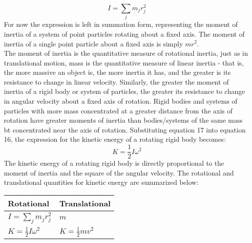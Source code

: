 \documentclass[a4paper]{article}
\begin{document}
\begin{equation}
    I = \sum_{j}m_jr^2_j
\end{equation}
For now the expression is left in summation form, representing the moment of inertia of a system of point particles rotating about a fixed axis. The moment of inertia of a single point particle about a fixed axis is simply $mr^2$.
\vspace{1mm}\\
The moment of inertia is the quantitative measure of rotational inertia, just as in translational motion, mass is the quantitative measure of linear inertia - that is, the more massive an object is, the more inertia it has, and the greater is its resistance to change in linear velocity. Similarly, the greater the moment of inertia of a rigid body or system of particles, the greater its resistance to change in angular velocity about a fixed axis of rotation. Rigid bodies and systems of particles with more mass concentrated at a greater distance from the axis of rotation have greater moments of inertia than bodies/systems of the same mass bt concentrated near the axis of rotation. Substituting equation 17 into equation 16, the expression for the kinetic energy of a rotating rigid body becomes:
\begin{equation}
    K = \frac{1}{2}I\omega^2
\end{equation}
The kinetic energy of a rotating rigid body is directly proportional to the moment of inertia and the square of the angular velocity. The rotational and translational quantities for kinetic energy are summarized below:
\begin{center}
    \begin{tabularx}{0.4\textwidth}{ 
        | >{\raggedright\arraybackslash}X 
        | >{\raggedright\arraybackslash}X |}
        \hline
        Rotational & Translational\\
        \hline
        $\displaystyle I = \sum_{j}m_jr^2_j$ & $m$\\
        \hline
        $\displaystyle K = \frac{1}{2}I\omega^2$ & $\displaystyle K = \frac{1}{2}mv^2$\\
        \hline
    \end{tabularx}
\end{center}
\end{document}
